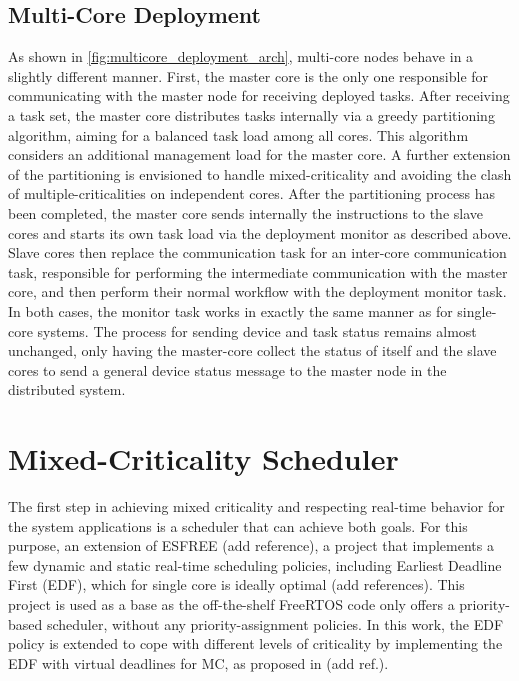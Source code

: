 \subsection{Multi-Core Deployment}
As shown in \ref{fig:multicore_deployment_arch}, multi-core nodes behave in a slightly different manner. First, the master core is the only one responsible for communicating with the master node for receiving deployed tasks. After receiving a task set, the master core distributes tasks internally via a greedy partitioning algorithm, aiming for a balanced task load among all cores. This algorithm considers an additional management load for the master core. A further extension of the partitioning is envisioned to handle mixed-criticality and avoiding the clash of multiple-criticalities on independent cores. After the partitioning process has been completed, the  master core sends internally the instructions to the slave cores and starts its own task load via the deployment monitor as described above. Slave cores then replace the communication task for an inter-core communication task, responsible for performing the intermediate communication with the master core, and then perform their normal workflow with the deployment monitor task. In both cases, the monitor task works in exactly the same manner as for single-core systems. The process for sending device and task status remains almost unchanged, only having the master-core collect the status of itself and the slave cores to send a general device status message to the master node in the distributed system. 


\section{Mixed-Criticality Scheduler}

The first step in achieving mixed criticality and respecting real-time behavior for the system applications is a scheduler that can achieve both goals. For this purpose, an extension of ESFREE (add reference), a project that implements a few dynamic and static real-time scheduling policies, including Earliest Deadline First (EDF), which for single core is ideally optimal (add references). This project is used as a base as the off-the-shelf FreeRTOS code only offers a priority-based scheduler, without any priority-assignment policies. In this work, the EDF policy is extended to cope with different levels of criticality by implementing the EDF with virtual deadlines for MC, as proposed in (add ref.).


